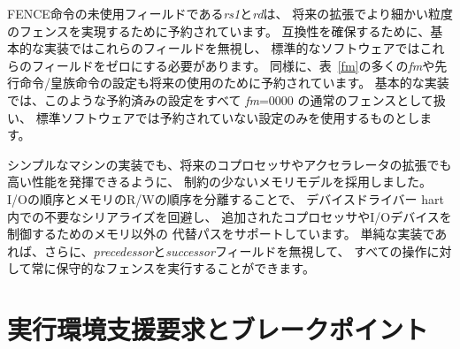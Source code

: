 FENCE命令の未使用フィールドである{\em rs1}と{\em rd}は、
将来の拡張でより細かい粒度のフェンスを実現するために予約されています。 
互換性を確保するために、基本的な実装ではこれらのフィールドを無視し、
標準的なソフトウェアではこれらのフィールドをゼロにする必要があります。
同様に、表~\ref{fm}の多くの{\em fm}や先行命令/皇族命令の設定も将来の使用のために予約されています。 
基本的な実装では、このような予約済みの設定をすべて {\em fm}=0000 の通常のフェンスとして扱い、
標準ソフトウェアでは予約されていない設定のみを使用するものとします。

\begin{commentary}
\begin{comment}
We chose a relaxed memory model to allow high performance from simple
machine implementations and from likely future
coprocessor or accelerator extensions.  We separate out I/O ordering
from memory R/W ordering to avoid unnecessary serialization within a
device-driver hart and also to support alternative non-memory paths
to control added coprocessors or I/O devices.  Simple implementations
may additionally ignore the {\em predecessor} and {\em successor}
fields and always execute a conservative fence on all operations.
\end{comment}

シンプルなマシンの実装でも、将来のコプロセッサやアクセラレータの拡張でも高い性能を発揮できるように、
制約の少ないメモリモデルを採用しました。
I/Oの順序とメモリのR/Wの順序を分離することで、
デバイスドライバー hart内での不要なシリアライズを回避し、
追加されたコプロセッサやI/Oデバイスを制御するためのメモリ以外の
代替パスをサポートしています。 
単純な実装であれば、さらに、{\em precedessor}と{\em successor}フィールドを無視して、
すべての操作に対して常に保守的なフェンスを実行することができます。
\end{commentary}

\begin{comment}
\section{Environment Call and Breakpoints}
\end{comment}
\section{実行環境支援要求とブレークポイント}

\begin{comment}
SYSTEM instructions are used to access system functionality that might
require privileged access and are encoded using the I-type instruction
format.  These can be divided into two main classes: those that
atomically read-modify-write control and status registers (CSRs), and
all other potentially privileged instructions. CSR instructions are
described in Chapter~\ref{csrinsts}, and the base unprivileged instructions
are described in the following section.
\end{comment}

